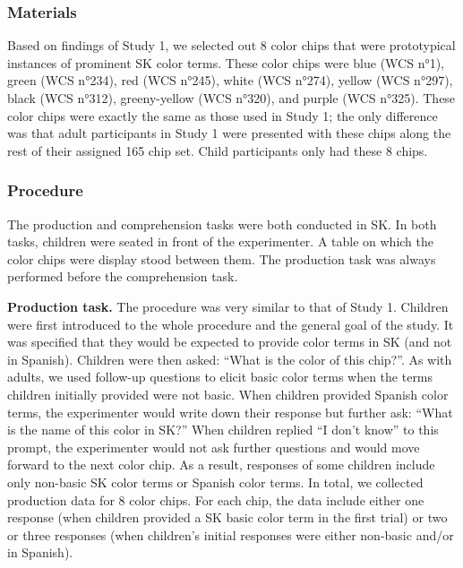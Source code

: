 \documentclass[
  english,
  ,man,floatsintext]{apa6}
\begin{document}
\hypertarget{materials}{%
\subsubsection{Materials}\label{materials}}

Based on findings of Study 1, we selected out 8 color chips that were prototypical instances of prominent SK color terms. These color chips were blue (WCS n°1), green (WCS n°234), red (WCS n°245), white (WCS n°274), yellow (WCS n°297), black (WCS n°312), greeny-yellow (WCS n°320), and purple (WCS n°325). These color chips were exactly the same as those used in Study 1; the only difference was that adult participants in Study 1 were presented with these chips along the rest of their assigned 165 chip set. Child participants only had these 8 chips.

\hypertarget{procedure}{%
\subsubsection{Procedure}\label{procedure}}

The production and comprehension tasks were both conducted in SK. In both tasks, children were seated in front of the experimenter. A table on which the color chips were display stood between them. The production task was always performed before the comprehension task.

\textbf{Production task.} The procedure was very similar to that of Study 1. Children were first introduced to the whole procedure and the general goal of the study. It was specified that they would be expected to provide color terms in SK (and not in Spanish). Children were then asked: \enquote{What is the color of this chip?}. As with adults, we used follow-up questions to elicit basic color terms when the terms children initially provided were not basic. When children provided Spanish color terms, the experimenter would write down their response but further ask: \enquote{What is the name of this color in SK?} When children replied \enquote{I don't know} to this prompt, the experimenter would not ask further questions and would move forward to the next color chip. As a result, responses of some children include only non-basic SK color terms or Spanish color terms. In total, we collected production data for 8 color chips. For each chip, the data include either one response (when children provided a SK basic color term in the first trial) or two or three responses (when children's initial responses were either non-basic and/or in Spanish).
\end{document}
